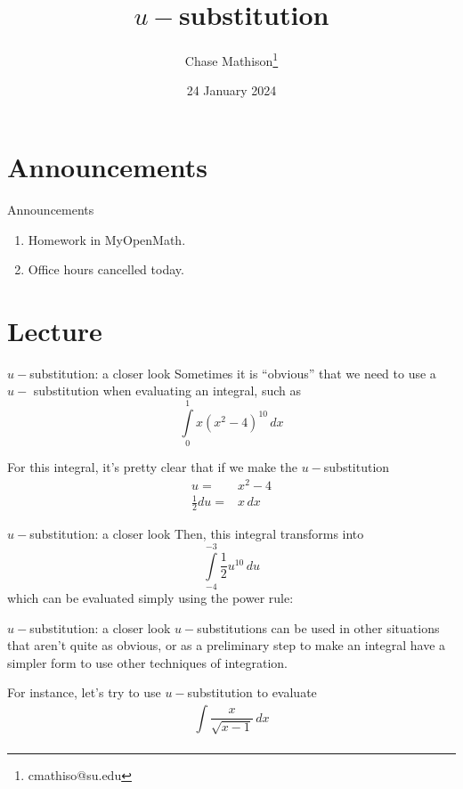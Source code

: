 \documentclass[presentation]{beamer}
\institute[SU]{Shenandoah University}
\author{Chase Mathison\thanks{cmathiso@su.edu}}
\date{24 January 2024}
\title{\(u-\)substitution}
\begin{document}
\maketitle

\section{Announcements}
\label{sec:orgb3dc0ad}
\begin{frame}[label={sec:org13bcc1c}]{Announcements}
\begin{enumerate}
\item Homework in MyOpenMath.
\item Office hours cancelled today.
\end{enumerate}
\end{frame}

\section{Lecture}
\label{sec:orgfd8fe94}
\begin{frame}[label={sec:orgc34ff36}]{\(u-\)substitution: a closer look}
Sometimes it is ``obvious'' that we need to use a \(u-\) substitution
when evaluating an integral, such as
\[
\int\limits_0^1 x \left( x^2-4 \right)^{10}\,dx \]

For this integral, it's pretty clear that if we make the \(u-\)substitution
\begin{align*}
u = & x^2-4 \\
\frac{1}{2}du = & x\,dx
\end{align*}
\end{frame}

\begin{frame}[label={sec:org39bddab}]{\(u-\)substitution: a closer look}
Then, this integral transforms into
\[
\int\limits_{-4}^{-3} \frac{1}{2}u^{10}\,du \]
which can be evaluated simply using the power rule:
\vspace{10in}
\end{frame}

\begin{frame}[label={sec:orgd85df03}]{\(u-\)substitution: a closer look}
\(u-\)substitutions can be used in other situations that
aren't quite as obvious, or as a preliminary step to make an integral
have a simpler form to use other techniques of integration.

For instance, let's try to use \(u-\)substitution to evaluate
\[
\int\limits_{}^{} \frac{x}{\sqrt{x-1}}\,dx \]
\vspace{10in}
\end{frame}
\end{document}
